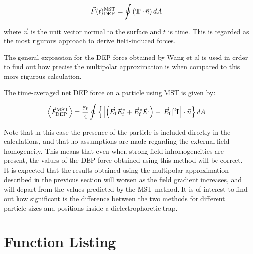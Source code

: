 \documentclass[12pt]{report}
\begin{document}
\begin{equation}\vec{F}(t)_{\rm{DEP}}^{\rm{MST}}=\oint{\left(\mathbf{T}\cdot\vec{n}\right)dA}\end{equation}

where $\vec{n}$ is the unit vector normal to the surface and $t$ is time. This is regarded as the most rigurous approach to derive field-induced forces.

The general expression for the DEP force obtained by Wang et al \cite{Wang1997} is used in order to find out how precise the multipolar approximation is when compared to this more rigurous calculation.

The time-averaged net DEP force on a particle using MST is given by:

\begin{equation}\left<\vec{F}_{\rm{DEP}}^{\rm{MST}}\right>=\frac{\varepsilon_{\rm{f}}}{4}\oint{\left\{\left[\left(\vec{E}_{\rm{f}}\vec{E}^*_{\rm{f}}+\vec{E}^*_{\rm{f}}\vec{E}_{\rm{f}}\right)-|\vec{E}_{\rm{f}}|^2\mathbf{I}\right]\cdot\vec{n}\right\}dA}\end{equation}

Note that in this case the presence of the particle is included directly in the calculations, and that no assumptions are made regarding the external field homogeneity. This means that even when strong field inhomogeneities are present, the values of the DEP force obtained using this method will be correct. It is expected that the results obtained using the multipolar approximation described in the previous section will worsen as the field gradient increases, and will depart from the values predicted by the MST method. It is of interest to find out how significant is the difference between the two methods for different particle sizes and positions inside a dielectrophoretic trap.
\pagebreak
\section*{}
\pagebreak

\appendix

\chapter{Function Listing}

\end{document}
